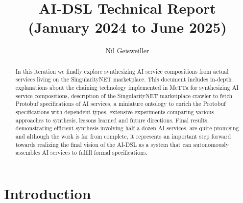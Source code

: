 \documentclass[]{report}
\begin{document}
\title{AI-DSL Technical Report\\(January 2024 to June 2025)}
\author{Nil Geisweiller}
\maketitle

\begin{abstract}
In this iteration we finally explore synthesizing AI service
compositions from actual services living on the SingularityNET
marketplace.  This document includes in-depth explanations about the
chaining technology implemented in MeTTa for synthesizing AI service
compositions, description of the SingularityNET marketplace crawler to
fetch Protobuf specifications of AI services, a miniature ontology to
enrich the Protobuf specifications with dependent types, extensive
experiments comparing various approaches to synthesis, lessons learned
and future directions.  Final results, demonstrating efficient
synthesis involving half a dozen AI services, are quite promising and
although the work is far from complete, it represents an important
step forward towards realizing the final vision of the AI-DSL as a
system that can autonomously assembles AI services to fulfill formal
specifications.
\end{abstract}

\tableofcontents

\chapter{Introduction}
\end{document}
